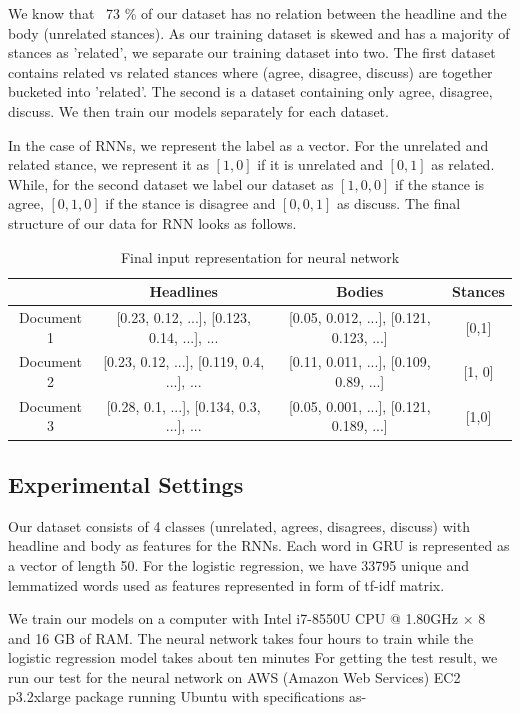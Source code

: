 \documentclass[11.5pt]{article}
\begin{document}
We know that ~73 \% of our dataset has no relation between the headline and the body (unrelated stances). As our training dataset is skewed and has a majority of stances as 'related', we separate our training dataset into two. The first dataset contains related vs related stances where (agree, disagree, discuss) are together bucketed into 'related'. The second is a dataset containing only agree, disagree, discuss. We then train our models separately for each dataset.

In the case of RNNs, we represent the label as a vector. For the unrelated and related stance, we represent it as $[1, 0]$ if it is unrelated and $[0, 1]$ as related.
While, for the second dataset we label our dataset as $[1, 0, 0]$ if the stance is agree, $[0, 1, 0]$ if the stance is disagree and $[0, 0, 1]$ as discuss. The final structure of our data for RNN looks as follows.

\begin{table}[h]
  \centering
  \begin{tabular} 
    {|c|c|c|c|}
    \hline
    & Headlines & Bodies & Stances \\
    \hline
    Document 1 & [0.23, 0.12, ...], [0.123, 0.14, ...], ... & [0.05, 0.012, ...], [0.121, 0.123, ...] & [0,1] \\
    \hline
    Document 2 & [0.23, 0.12, ...], [0.119, 0.4, ...], ... & [0.11, 0.011, ...], [0.109, 0.89, ...] & [1, 0] \\
    \hline
    Document 3 & [0.28, 0.1, ...], [0.134, 0.3, ...], ... & [0.05, 0.001, ...], [0.121, 0.189, ...] & [1,0] \\
    \hline
  \end{tabular}
  \caption{Final input representation for neural network}
\end{table}

\subsection{Experimental Settings}

Our dataset consists of 4 classes (unrelated, agrees, disagrees, discuss) with headline and body as features for the RNNs. Each word in GRU is represented as a vector of length 50.
For the logistic regression, we have 33795 unique and lemmatized words used as features represented in form of tf-idf matrix.

We train our models on a computer with Intel i7-8550U CPU @ 1.80GHz × 8 and 16 GB of RAM. The neural network takes four hours to train while the logistic regression model takes about ten minutes
For getting the test result, we run our test for the neural network on AWS (Amazon Web Services) EC2 p3.2xlarge package running Ubuntu with specifications as-
\end{document}
